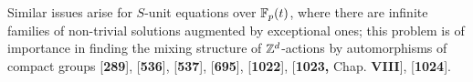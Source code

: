 Similar issues arise for $S$-unit equations over $\Bbb{F}_p(t)$, where there are infinite families of non-trivial solutions augmented by exceptional ones; this problem is of importance in finding the mixing structure of $\Bbb{Z}^d$-actions by automorphisms of compact groups [{\bf 289}], [{\bf 536}], [{\bf 537}], [{\bf 695}], [{\bf 1022}], [{\bf 1023,} Chap. {\bf VIII}], [{\bf 1024}].

\bye
